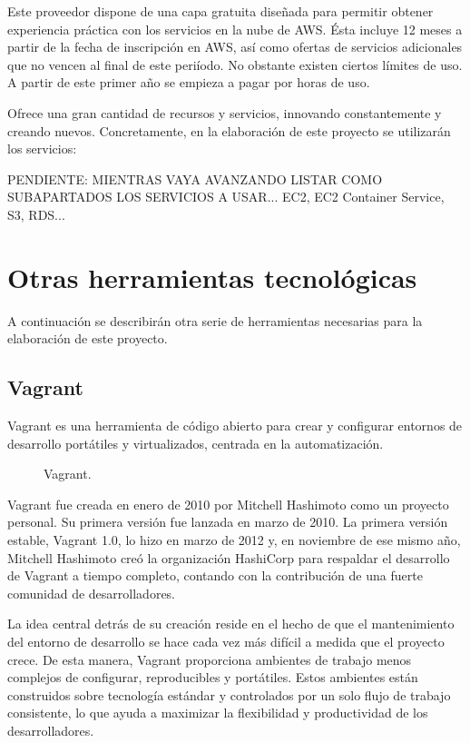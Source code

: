 Este proveedor dispone de una capa gratuita diseñada para permitir obtener experiencia práctica con los servicios en la nube de AWS. Ésta incluye 12 meses a partir de la fecha de inscripción en AWS, así como ofertas de servicios adicionales que no vencen al final de este periíodo. No obstante existen ciertos límites de uso. A partir de este primer año se empieza a pagar por horas de uso.

Ofrece una gran cantidad de recursos y servicios, innovando constantemente y creando nuevos. Concretamente, en la elaboración de este proyecto se utilizarán los servicios:

PENDIENTE: MIENTRAS VAYA AVANZANDO LISTAR COMO SUBAPARTADOS LOS SERVICIOS A USAR... EC2, EC2 Container Service, S3, RDS...

\section{Otras herramientas tecnológicas}

A continuación se describirán otra serie de herramientas necesarias para la elaboración de este proyecto.

\subsection{Vagrant}

Vagrant es una herramienta de código abierto para crear y configurar entornos de desarrollo portátiles y virtualizados, centrada en la automatización.

\begin{figure}[H]
\caption{Vagrant.\label{fig:figure_placement_example}}
\end{figure}

Vagrant fue creada en enero de 2010 por Mitchell Hashimoto como un proyecto personal. Su primera versión fue lanzada en marzo de 2010. La primera versión estable, Vagrant 1.0, lo hizo en marzo de 2012 y, en noviembre de ese mismo año, Mitchell Hashimoto creó la organización HashiCorp para respaldar el desarrollo de Vagrant a tiempo completo, contando con la contribución de una fuerte comunidad de desarrolladores.

La idea central detrás de su creación reside en el hecho de que el mantenimiento del entorno de desarrollo se hace cada vez más difícil a medida que el proyecto crece. De esta manera, Vagrant proporciona ambientes de trabajo menos complejos de configurar, reproducibles y portátiles. Estos ambientes están construidos sobre tecnología estándar y controlados por un solo flujo de trabajo consistente, lo que ayuda a maximizar la flexibilidad y productividad de los desarrolladores.

